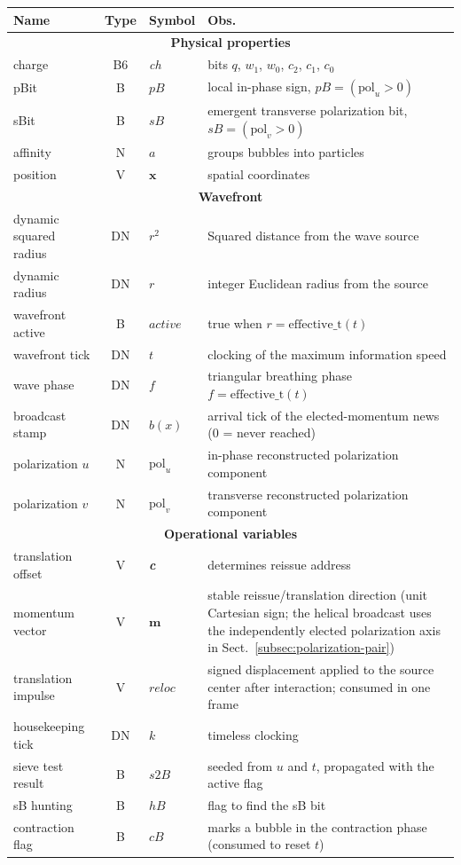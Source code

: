 \documentclass{ijuc}
\begin{document}
\begin{table}
\begin{centering}
\begin{tabular}{|l|c|l|l|}
\hline 
\textbf{\large{}Name} & \textbf{\large{}Type} & \textbf{\large{}Symbol} & \textbf{\large{}Obs.}\tabularnewline
\hline 
\hline 
\multicolumn{4}{|c|}{\textbf{Physical properties}}\tabularnewline
\hline 
charge & B6 & \emph{ch} & bits $q$, $w_{1}$, $w_{0}$, $c_{2}$, $c_{1}$, $c_{0}$\tabularnewline
\hline 
pBit & B & $pB$ & local in-phase sign, $pB=(\mathrm{pol}_u>0)$\tabularnewline
\hline 
sBit & B & $sB$ & emergent transverse polarization bit, $sB=(\mathrm{pol}_v>0)$\tabularnewline
\hline 
affinity & N & $a$ & groups bubbles into particles\tabularnewline
\hline 
position & V & $\boldsymbol{x}$ & spatial coordinates\tabularnewline
\hline 
\multicolumn{4}{|c|}{\textbf{Wavefront}}\tabularnewline
\hline 
dynamic squared radius & DN & $r^{2}$ & Squared distance from the wave source\tabularnewline
\hline 
dynamic radius & DN & $r$ & integer Euclidean radius from the source\tabularnewline
\hline 
wavefront active & B & $\mathit{active}$ & true when $r=\mathrm{effective\_t}(t)$\tabularnewline
\hline 
wavefront tick & DN & $t$ & clocking of the maximum information speed\tabularnewline
\hline 
wave phase & DN & $f$ & triangular breathing phase $f=\mathrm{effective\_t}(t)$\tabularnewline
\hline 
broadcast stamp & DN & $b(x)$ & arrival tick of the elected-momentum news ($0$ = never reached)\tabularnewline
\hline 
polarization $u$ & N & $\mathrm{pol}_u$ & in-phase reconstructed polarization component\tabularnewline
\hline 
polarization $v$ & N & $\mathrm{pol}_v$ & transverse reconstructed polarization component\tabularnewline
\hline 
\multicolumn{4}{|c|}{\textbf{Operational variables}}\tabularnewline
\hline 
translation offset & V & \textbf{\emph{c}} & determines reissue address\tabularnewline
\hline
momentum vector & V & $\boldsymbol{m}$ & stable reissue/translation direction (unit Cartesian sign; the helical broadcast uses the independently elected polarization axis in Sect.~\ref{subsec:polarization-pair})\tabularnewline
\hline
translation impulse & V & $\boldsymbol{\mathit{reloc}}$ & signed displacement applied to the source center after interaction; consumed in one frame\tabularnewline
\hline
housekeeping tick & DN & $k$ & timeless clocking\tabularnewline
\hline 
sieve test result & B & $s2B$ & seeded from $u$ and $t$, propagated with the active flag\tabularnewline
\hline 
sB hunting & B & $hB$ & flag to find the sB bit\tabularnewline
\hline 
contraction flag & B & $cB$ & marks a bubble in the contraction phase (consumed to reset $t$)\tabularnewline

\end{tabular}
\end{centering}
\end{table}
\end{document}
